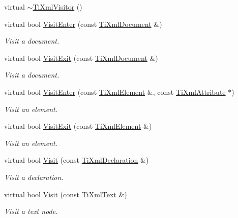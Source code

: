 \begin{DoxyCompactItemize}
\item 
virtual \hyperlink{class_ti_xml_visitor_a276c739ec4701f27c3f86b8ead095e5a}{$\sim$\-Ti\-Xml\-Visitor} ()
\item 
virtual bool \hyperlink{class_ti_xml_visitor_a07baecb52dd7d8716ae2a48ad0956ee0}{Visit\-Enter} (const \hyperlink{class_ti_xml_document}{Ti\-Xml\-Document} \&)
\begin{DoxyCompactList}\small\item\em Visit a document. \end{DoxyCompactList}\item 
virtual bool \hyperlink{class_ti_xml_visitor_aa0ade4f27087447e93974e975c3246ad}{Visit\-Exit} (const \hyperlink{class_ti_xml_document}{Ti\-Xml\-Document} \&)
\begin{DoxyCompactList}\small\item\em Visit a document. \end{DoxyCompactList}\item 
virtual bool \hyperlink{class_ti_xml_visitor_af6c6178ffa517bbdba95d70490875fff}{Visit\-Enter} (const \hyperlink{class_ti_xml_element}{Ti\-Xml\-Element} \&, const \hyperlink{class_ti_xml_attribute}{Ti\-Xml\-Attribute} $\ast$)
\begin{DoxyCompactList}\small\item\em Visit an element. \end{DoxyCompactList}\item 
virtual bool \hyperlink{class_ti_xml_visitor_aec2b1f8116226d52f3a1b95dafd3a32c}{Visit\-Exit} (const \hyperlink{class_ti_xml_element}{Ti\-Xml\-Element} \&)
\begin{DoxyCompactList}\small\item\em Visit an element. \end{DoxyCompactList}\item 
virtual bool \hyperlink{class_ti_xml_visitor_afad71c71ce6473fb9b4b64cd92de4a19}{Visit} (const \hyperlink{class_ti_xml_declaration}{Ti\-Xml\-Declaration} \&)
\begin{DoxyCompactList}\small\item\em Visit a declaration. \end{DoxyCompactList}\item 
virtual bool \hyperlink{class_ti_xml_visitor_a399b8ebca5cd14664974a32d2ce029e5}{Visit} (const \hyperlink{class_ti_xml_text}{Ti\-Xml\-Text} \&)
\begin{DoxyCompactList}\small\item\em Visit a text node. \end{DoxyCompactList}\item 

\end{DoxyCompactItemize}
